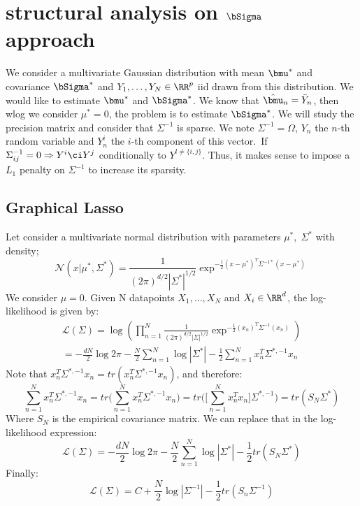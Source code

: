 
\section{structural analysis on $\bSigma$ approach}

We consider a multivariate Gaussian distribution with mean $\bmu^*$ and covariance $\bSigma^*$ and $Y_1,\dots,Y_N \in \RR^p$ iid drawn from this distribution. We would like to estimate $\bmu^*$ and $\bSigma^*$. We know that $\hat\bmu_n=\bar Y_n$, then wlog we consider $\mu^*=0$, the problem is to estimate $\bSigma^*$. We will study the precision matrix and consider that $\Sigma^{-1}$ is sparse. We note $\Sigma^{-1}=\Omega$, $Y_n$ the $n$-th random variable and $Y_n^i$ the $i$-th component of this vector.\
If $\Sigma^{-1}_{ij}=0 \Rightarrow Y^i \ci Y^j$ conditionally to $Y^{l\ne\{i,j\}}$. Thus, it makes sense to impose a $L_1$ penalty on $\Sigma^{-1}$ to increase its sparsity.

\subsection{Graphical Lasso}
Let consider a multivariate normal distribution with parameters $\mu^*,\; \Sigma^*$ with density;
\begin{equation}
\mathcal N(x|\mu^*,\Sigma^*)
=\frac{1}{(2\pi)^{d/2}|\Sigma^*|^{1/2}}\exp^{-\frac{1}{2}(x-\mu^*)^T\Sigma^{-1*}(x-\mu^*)}
\end{equation}
We consider $\mu=0$. Given N datapoints $X_1,\dots,X_N$ and $X_i \in \RR^d$, the log-likelihood is given by:
\begin{equation}
\begin{split}
\mathcal{L}(\Sigma)=\log\left(\prod_{n=1}^N\frac{1}{(2\pi)^{d/2}|\Sigma|^{1/2}}\exp^{-\frac{1}{2}(x_n)^T\Sigma^{-1}(x_n)}\right)\\
=-\frac{dN}{2}\log 2\pi - \frac{N}{2}\sum_{n=1}^N\log |\Sigma^*|- \frac{1}{2}\sum_{n=1}^N x_n^T\Sigma^{*,-1}x_n
\end{split}
\end{equation}
Note that $x_n^T\Sigma^{*,-1}x_n=tr(x_n^T\Sigma^{*,-1}x_n)$, and therefore:
\begin{equation}
\sum_{n=1}^N x_n^T\Sigma^{*,-1}x_n=tr\big(\sum_{n=1}^N x_n^T\Sigma^{*,-1}x_n\big)=tr\Big(\big[\sum_{n=1}^N x_n^Tx_n\big]\Sigma^{*,-1}\Big)=tr(S_N\Sigma^*)
\end{equation}
Where $S_N$ is the empirical covariance matrix. We can replace that in the log-likelihood expression:
\begin{equation}
\mathcal{L}(\Sigma)=-\frac{dN}{2}\log 2\pi - \frac{N}{2}\sum_{n=1}^N\log |\Sigma^*|- \frac{1}{2}tr(S_N\Sigma^*)
\end{equation}
Finally:
\begin{equation}
\mathcal{L}(\Sigma)=C+\frac{N}{2}\log|\Sigma^{-1}|-\frac{1}{2} tr(S_n\Sigma^{-1})
\end{equation}

